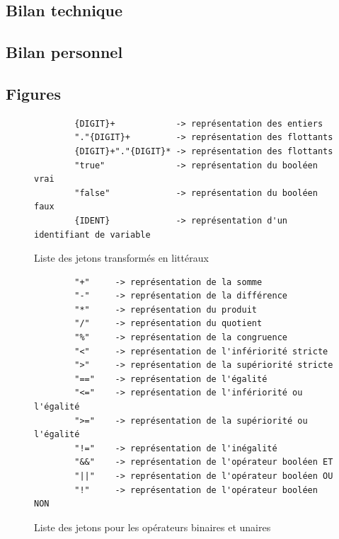 \documentclass[a4paper, 11pt]{article}
\begin{document}
\subsection{Bilan technique}
\subsection{Bilan personnel}

\clearpage
\begin{appendix}
\section{Figures}

\begin{figure}
    \centering
    \begin{verbatim}
        {DIGIT}+            -> représentation des entiers
        "."{DIGIT}+         -> représentation des flottants
        {DIGIT}+"."{DIGIT}* -> représentation des flottants
        "true"              -> représentation du booléen vrai
        "false"             -> représentation du booléen faux
        {IDENT}             -> représentation d'un identifiant de variable
    \end{verbatim}
    \caption{Liste des jetons transformés en littéraux}
    \label{fig:jetons_literal}
\end{figure}

\begin{figure}
    \centering
    \begin{verbatim}
        "+"     -> représentation de la somme
        "-"     -> représentation de la différence
        "*"     -> représentation du produit
        "/"     -> représentation du quotient
        "%"     -> représentation de la congruence
        "<"     -> représentation de l'infériorité stricte
        ">"     -> représentation de la supériorité stricte
        "=="    -> représentation de l'égalité
        "<="    -> représentation de l'infériorité ou l'égalité
        ">="    -> représentation de la supériorité ou l'égalité
        "!="    -> représentation de l'inégalité
        "&&"    -> représentation de l'opérateur booléen ET
        "||"    -> représentation de l'opérateur booléen OU
        "!"     -> représentation de l'opérateur booléen NON
    \end{verbatim}
    \caption{Liste des jetons pour les opérateurs binaires et unaires}
    \label{fig:jetons_binaires_unaires}
\end{figure}


\end{appendix}
\end{document}
